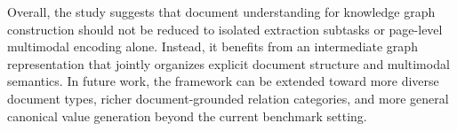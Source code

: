 \documentclass[pdflatex,twocolumn,iicol,sn-vancouver-num]{sn-jnl}%
\theoremstyle{thmstyleone}%
\theoremstyle{thmstyletwo}%
\theoremstyle{thmstylethree}%
\begin{document}
Overall, the study suggests that document understanding for knowledge graph construction should not be reduced to isolated extraction subtasks or page-level multimodal encoding alone. Instead, it benefits from an intermediate graph representation that jointly organizes explicit document structure and multimodal semantics. In future work, the framework can be extended toward more diverse document types, richer document-grounded relation categories, and more general canonical value generation beyond the current benchmark setting.






\end{document}
